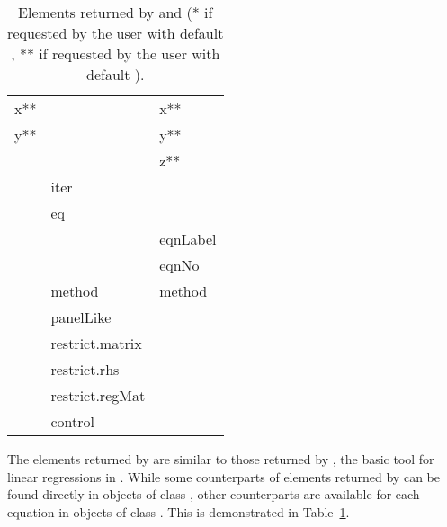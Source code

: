 \begin{table}[htbp]
{\begin{tabular}{|l|l|l|}
x\textnormal{**} &               & x\textnormal{**} \\
y\textnormal{**} &               & y\textnormal{**} \\
                &                & z\textnormal{**} \\
                & iter           & \\
                & eq             & \\
                &                & eqnLabel \\
                &                & eqnNo \\
                & method         & method \\
                & panelLike      & \\
                & restrict.matrix& \\
                & restrict.rhs   & \\
                & restrict.regMat& \\
                & control        & \\
\hline
\end{tabular}
}
\caption{Elements returned by  and 
(* if requested by the user with default ,
** if requested by the user with default ).}
\label{tab:compare-lm}
\end{table}


The elements returned by 
are similar to those returned by ,
the basic tool for linear regressions in .
While some counterparts of elements returned by 
can be found directly in objects of class ,
other counterparts are available for each equation
in objects of class .
This is demonstrated in Table~\ref{tab:compare-lm}.
